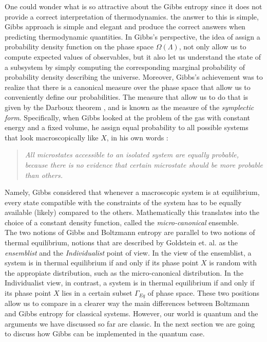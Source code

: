 \indent One could wonder what is so attractive about the Gibbs entropy since it does not provide a correct interpretation of thermodynamics. the answer to this is simple, Gibbs approach is simple and elegant and produce the correct answers when predicting thermodynamic quantities. In Gibbs's perspective, the idea of assign a probability density function on the phase space $\Omega(\Lambda)$, not only allow us to compute expected values of observables, but it also let us understand the state of a subsystem by simply computing the corresponding marginal probability of probability density describing the universe. Moreover, Gibbs's achievement \cite{gibbs_elementary_1902} was to realize that there is a canonical measure over the phase space that allow us to conveniently define our probabilities. The measure that allow us to do that is given by the Darboux theorem \cite{butterfield_symplectic_2007, butterfield_representation_2007}, and is known as the measure of the \textit{symplectic form}. Specifically, when Gibbs looked at the problem of the gas with constant energy and a fixed volume, he assign equal probability to all possible systems that look macroscopically like $X$, in his own words \cite{gibbs_elementary_1902}:
\begin{quote}
\textit{All microstates accessible to an isolated system are equally probable, because there is no evidence that certain microstate should be more probable than others.}
\end{quote}
\indent Namely, Gibbs considered that whenever a macroscopic system is at equilibrium, every state compatible with the constraints of the system has to be equally available (likely) compared to the others. Mathematically this translates into the choice of a constant density function, called the \textit{micro-canonical} ensemble.\\

\indent The two notions of Gibbs and Boltzmann entropy are parallel to two notions of thermal equilibrium, notions that are described by Goldstein et. al.\cite{goldstein_gibbs_2020} as the \textit{ensemblist} and the \textit{Individualist} point of view. In the view of the ensemblist, a system is in thermal equilibrium if and only if its phase point $X$ is random with the appropiate distribution, such as the micro-canonical distribution. In the Individualist view, in contrast, a system is in thermal equilibrium if and only if its phase point $X$ lies in a certain subset $\Gamma_{Eq}$ of phase space. These two positions allow us to compare in a clearer way the main differences between Boltzmann and Gibbs entropy for classical systems. However, our world is quantum and the arguments we have discussed so far are classic. In the next section we are going to discuss how Gibbs can be implemented in the quantum case.

